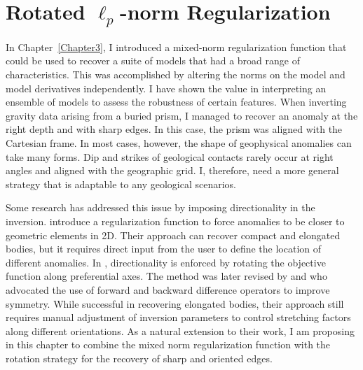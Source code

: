 \graphicspath{{./../../Figures/}}
\chapter{Rotated $\ell_p$-norm Regularization}
\label{Chapter5}

In Chapter~\ref{Chapter3}, I introduced a mixed-norm regularization function that could be used to recover a suite of models that had a broad range of characteristics. This was accomplished by altering the norms on the model and model derivatives independently. I have shown the value in interpreting an ensemble of models to assess the robustness of certain features. When inverting gravity data arising from a buried prism, I managed to recover an anomaly at the right depth and with sharp edges. In this case, the prism was aligned with the Cartesian frame.
In most cases, however, the shape of geophysical anomalies can take many forms. Dip and strikes of geological contacts rarely occur at right angles and aligned with the geographic grid. I, therefore, need a more general strategy that is adaptable to any geological scenarios.

Some research has addressed this issue by imposing directionality in the inversion.
\cite{Barbosa2006} introduce a regularization function to force anomalies to be closer to geometric elements in 2D. Their approach can recover compact and elongated bodies, but it requires direct input from the user to define the location of different anomalies.
In \cite{LiDWO2000}, directionality is enforced by rotating the objective function along preferential axes.
The method was later revised by \cite{PhDLelievre09} and \cite{Davis2012} who advocated the use of forward and backward difference operators to improve symmetry. While successful in recovering elongated bodies, their approach still requires manual adjustment of inversion parameters to control stretching factors along different orientations.
As a natural extension to their work, I am proposing in this chapter to combine the mixed norm regularization function with the rotation strategy for the recovery of sharp and oriented edges.

